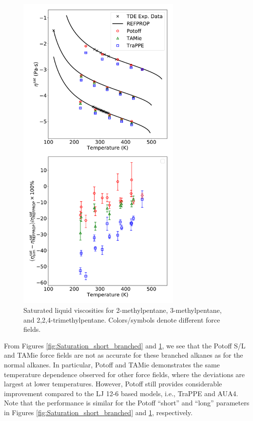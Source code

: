 \documentclass[preprint,review,12pt]{elsarticle}
\begin{document}
	\begin{figure}[p!]
		\centering
		\includegraphics[width=3.2in]{compare_force_fields_long_branched.pdf}
		\caption{Saturated liquid viscosities for 2-methylpentane, 3-methylpentane, and 2,2,4-trimethylpentane. Colors/symbols denote different force fields.}
		\label{fig:Saturation_long_branched}
	\end{figure} 
	
	From Figures \ref{fig:Saturation_short_branched} and \ref{fig:Saturation_long_branched}, we see that the Potoff S/L and TAMie force fields are not as accurate for these branched alkanes as for the normal alkanes. In particular, Potoff and TAMie demonstrates the same temperature dependence observed for other force fields, where the deviations are largest at lower temperatures. However, Potoff still provides considerable improvement compared to the LJ 12-6 based models, i.e., TraPPE and AUA4. Note that the performance is similar for the Potoff ``short'' and ``long'' parameters in Figures \ref{fig:Saturation_short_branched} and \ref{fig:Saturation_long_branched}, respectively. 
	
\end{document}
